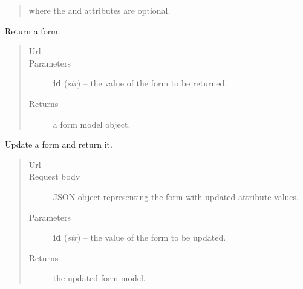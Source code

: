 \documentclass[letterpaper,10pt,english]{sphinxmanual}
\begin{document}
\begin{fulllineitems}
\begin{fulllineitems}
\begin{quote}
\begin{description}
where the  and  attributes are optional.

\end{description}\end{quote}

\end{fulllineitems}


\begin{fulllineitems}
\label{api:onlinelinguisticdatabase.controllers.forms.FormsController.show}
Return a form.
\begin{quote}\begin{description}
\item[{Url }] \leavevmode
{}

\item[{Parameters}] \leavevmode
\textbf{id} (\emph{str}) -- the  value of the form to be returned.

\item[{Returns}] \leavevmode
a form model object.

\end{description}\end{quote}

\end{fulllineitems}


\begin{fulllineitems}
\label{api:onlinelinguisticdatabase.controllers.forms.FormsController.update}
Update a form and return it.
\begin{quote}\begin{description}
\item[{Url }] \leavevmode
{}

\item[{Request body}] \leavevmode
JSON object representing the form with updated attribute values.

\item[{Parameters}] \leavevmode
\textbf{id} (\emph{str}) -- the  value of the form to be updated.

\item[{Returns}] \leavevmode
the updated form model.


\end{description}
\end{quote}
\end{fulllineitems}
\end{fulllineitems}
\end{document}
